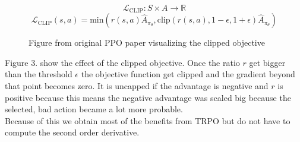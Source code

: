 \documentclass{article}
\begin{document}
\begin{equation}
    {\mathcal L}_{\mathrm{CLIP}}: S\times A \xrightarrow{} \mathbb{R}
\end{equation}
\begin{equation*}
    {\mathcal L}_{\mathrm{CLIP}}(s, a) = \mathrm{min}(r(s,a) \hat{A}_{\pi_\theta}, \mathrm{clip}(r(s,a), 1 - \epsilon, 1 + \epsilon)\hat{A}_{\pi_\theta})
\end{equation*}

\begin{figure}
    \centering
    \qquad
    \caption{Figure from original PPO paper visualizing the clipped objective~\cite{DBLP:journals/corr/SchulmanWDRK17}}
\end{figure}

\noindent Figure 3. show the effect of the clipped objective. Once the ratio
$r$ get bigger than the threshold $\epsilon$ the objective function get clipped and the gradient
beyond that point becomes zero. It is uncapped if the advantage is negative
and $r$ is positive because this means the negative advantage was scaled big because 
the selected, bad action became a lot more probable.\\
Because of this we obtain most of the benefits from TRPO but do not have
to compute the second order derivative.
\end{document}
